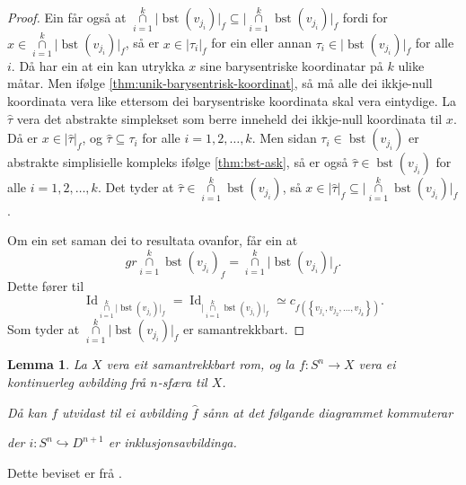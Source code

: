 \documentclass[a4paper, 12pt, norsk]{article}
\theoremstyle{plain}
\newtheorem{lemma}[theorem]{Lemma}
\theoremstyle{definition}
\newcommand{\intersect}{ \mathop{\cap}\limits }
\newcommand{\gr}[1]{ \lvert #1 \rvert } %
\newcommand{\set}[1]{ \left\{ #1 \right\} } %
\DeclareMathOperator{\bst}{bst} %
\DeclareMathOperator{\Id}{Id} %
\begin{document}
\begin{proof}
	Ein får også at \( \intersect_{i = 1}^k \gr{\bst(v_{j_i})}_f \subseteq \gr{\intersect_{i = 1}^k \bst(v_{j_i})}_f \) fordi for \( x \in \intersect_{i = 1}^k \gr{\bst(v_{j_i})}_f \), så er \( x \in \gr{\tau_i}_f \) for ein eller annan \( \tau_i \in \gr{\bst(v_{j_i})}_f \) for alle \( i \). Då har ein at ein kan utrykka \( x \) sine barysentriske koordinatar på \( k \) ulike måtar. Men ifølge \autoref{thm:unik-barysentrisk-koordinat}, så må alle dei ikkje-null koordinata vera like ettersom dei barysentriske koordinata skal vera eintydige. La \( \hat{\tau} \) vera det abstrakte simplekset som berre inneheld dei ikkje-null koordinata til \( x \). Då er \( x \in \gr{\hat{\tau}}_f \), og \( \hat{\tau} \subseteq \tau_i \) for alle \( i = 1, 2, \dots, k \). Men sidan \( \tau_i \in \bst(v_{j_i}) \) er abstrakte simplisielle kompleks ifølge \autoref{thm:bst-ask}, så er også \( \hat{\tau} \in  \bst(v_{j_i}) \) for alle \( i = 1, 2, \dots, k \). Det tyder at \( \hat{\tau} \in \intersect_{i = 1}^k \bst(v_{j_i}) \), så \( x \in \gr{\hat{\tau}}_f \subseteq \gr{\intersect_{i = 1}^k \bst(v_{j_i})}_f \).
	
	Om ein set saman dei to resultata ovanfor, får ein at
	\[
		gr{\intersect_{i = 1}^k \bst(v_{j_i})}_f = \intersect_{i = 1}^k \gr{\bst(v_{j_i})}_f.
	\]
	Dette fører til
	\[ 
		\Id_{\intersect_{i = 1}^k \gr{\bst(v_{j_i})}_f} = \Id_{\gr{\intersect_{i = 1}^k \bst(v_{j_i})}_f} \simeq c_{f(\set{v_{j_1}, v_{j_2}, \dots, v_{j_k}})}.
	\]
	Som tyder at \( \intersect_{i = 1}^k \gr{\bst(v_{j_i})}_f \) er samantrekkbart.
\end{proof}

\begin{lemma} \label{thm:utvida-avb}
	La \( X \) vera eit samantrekkbart rom, og la \( f: S^n \to X \) vera ei kontinuerleg avbilding frå \( n \)-sfæra til \( X \). 
	
	Då kan \( f \) utvidast til ei avbilding \( \hat{f} \) sånn at det følgande diagrammet kommuterar

	\begin{center}
	\end{center}
	der \( i: S^n \hookrightarrow D^{n+1} \) er inklusjonsavbildinga.
\end{lemma}

Dette beviset er frå \cite[s. 319--320]{MR3932132}.
\end{document}

